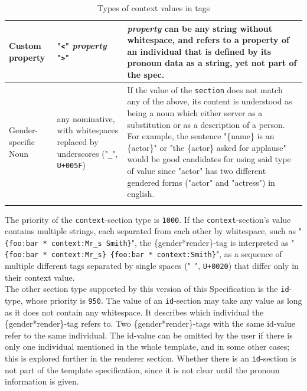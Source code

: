 \documentclass{article}
\begin{document}
\begin{flushleft}
\begin{center}
\begin{longtable}{| >{\raggedright\arraybackslash}p{7em} | >{\raggedright\arraybackslash}p{9em} | >{\raggedright\arraybackslash}p{14em} |}
                 \hline
                 \hline
                 Custom property & "\texttt{<}" \emph{property} "\texttt{>}" & \emph{property} can be any string without whitespace, and refers to a property of an individual that is defined by its pronoun data as a string, yet not part of the spec. \\
                 \hline
                 \hline
                 Gender-specific Noun & any nominative, with whitespaces replaced by underscores ("\texttt{\_}", \texttt{U+005F}) & If the value of the \texttt{section} does not match any of the above, its content is understood as being a noun which either server as a substitution or as a description of a person.
                 For example, the sentence "\{name\} is an \{actor\}" or "the \{actor\} asked for applause" would be good candidates for using said type of value since "actor" has two different gendered forms ("actor" and "actress") in english. \\
                 \hline
                \caption{Types of context values in tags}
            \end{longtable}
        \end{center}
    \end{flushleft}

    The priority of the \texttt{context}-section type is \texttt{1000}.
    If the \texttt{context}-section's value contains multiple strings, each separated from each other by whitespace, such as "\texttt{\{foo:bar * context:Mr\_s Smith\}}", the \{gender*render\}-tag is interpreted as "\texttt{\{foo:bar * context:Mr\_s\} \{foo:bar * context:Smith\}}", as a sequence of multiple different tags separated by single spaces ("\texttt{ }", \texttt{U+0020}) that differ only in their context value. \\

    The other section type supported by this version of this Specification is the \texttt{id}-type, whose priority is \texttt{950}.
    The value of an \texttt{id}-section may take any value as long as it does not contain any whitespace.
    It describes which individual the \{gender*render\}-tag refers to.
    Two \{gender*render\}-tags with the same id-value refer to the same individual.
    The id-value can be omitted by the user if there is only one individual mentioned in the whole template, and in some other cases;
    this is explored further in the renderer section.
    Whether there is an \texttt{id}-section is not part of the template specification, since it is not clear until the pronoun information is given.\\
\end{document}
